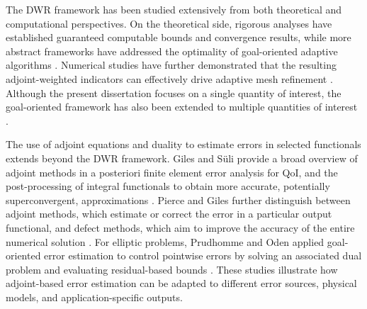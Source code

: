 
The DWR framework has been studied extensively from both theoretical and computational perspectives. On the theoretical side, rigorous analyses have established guaranteed computable bounds and convergence results, while more abstract frameworks have addressed the optimality of goal-oriented adaptive algorithms \cite{Ainsworth_Rankin_2012,Ladevese_Pled_Chamoin_2013,Mommer_Stevenson_2009,Feischl_Praetorius_van_der_Zee_2016}. Numerical studies have further demonstrated that the resulting adjoint-weighted indicators can effectively drive adaptive mesh refinement \cite{R6,ThieleWick2024,non-flow}. Although the present dissertation focuses on a single quantity of interest, the goal-oriented framework has also been extended to multiple quantities of interest \cite{multi1,multi2}.

The use of adjoint equations and duality to estimate errors in selected functionals extends beyond the DWR framework. Giles and S\"uli provide a broad overview of adjoint methods in a posteriori finite element error analysis for QoI, and the post-processing of integral functionals to obtain more accurate, potentially superconvergent, approximations \cite{Giles_Suli_2002}. Pierce and Giles further distinguish between adjoint methods, which estimate or correct the error in a particular output functional, and defect methods, which aim to improve the accuracy of the entire numerical solution \cite{Pierce_Giles_2004}. For elliptic problems, Prudhomme and Oden applied goal-oriented error estimation to control pointwise errors by solving an associated dual problem and evaluating residual-based bounds \cite{PRUDHOMME_1999}. These studies illustrate how adjoint-based error estimation can be adapted to different error sources, physical models, and application-specific outputs.

